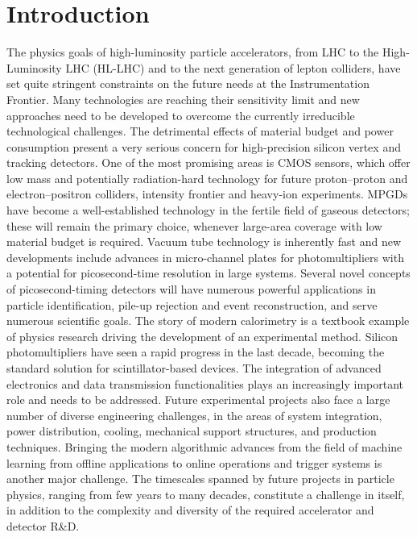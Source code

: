 \documentclass[10pt,final]{report}
\begin{document}
\section*{Introduction}
The physics goals of high-luminosity particle accelerators, from LHC to the High-
Luminosity LHC (HL-LHC) and to the
next generation of lepton colliders, have set quite stringent constraints on the future needs at
the Instrumentation Frontier. Many technologies are reaching their sensitivity limit and new
approaches need to be developed to overcome the currently irreducible technological
challenges. The detrimental effects of material budget and power consumption present
a very serious concern for high-precision silicon vertex and tracking detectors. One of the
most promising areas is CMOS sensors, which offer low mass and potentially radiation-hard
technology for future proton--proton and electron--positron colliders, intensity frontier and
heavy-ion experiments. MPGDs have become a well-established technology in the fertile field
of gaseous detectors; these will remain the primary choice, whenever large-area
coverage with low material budget is required. Vacuum tube technology is inherently fast and
new developments include advances in micro-channel plates for photomultipliers with a
potential for picosecond-time resolution in large systems. Several novel concepts of
picosecond-timing detectors will have numerous powerful applications in particle
identification, pile-up rejection and event reconstruction, and serve numerous scientific goals.
The story of modern calorimetry is a textbook example of physics research driving the
development of an experimental method. Silicon photomultipliers have seen a rapid progress
in the last decade, becoming the standard solution for scintillator-based devices. The
integration of advanced electronics and data transmission functionalities plays an
increasingly important role and needs to be addressed. Future experimental projects also
face a large number of diverse engineering challenges, in the areas of system integration,
power distribution, cooling, mechanical support structures, and production techniques.
Bringing the modern algorithmic advances from the field of machine learning from offline
applications to online operations and trigger systems is another major challenge. The
timescales spanned by future projects in particle physics, ranging from few years to many
decades, constitute a challenge in itself, in addition to the complexity and diversity of the
required accelerator and detector R\&D.
\end{document}
